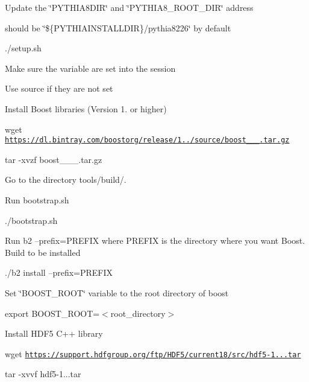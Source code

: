 \begin{DoxyEnumerate}
\begin{DoxyItemize}
\item Update the \char`\"{}\+P\+Y\+T\+H\+I\+A8\+D\+I\+R\char`\"{} and \char`\"{}\+P\+Y\+T\+H\+I\+A8\+\_\+\+R\+O\+O\+T\+\_\+\+D\+I\+R\char`\"{} address
\begin{DoxyItemize}
\item should be \char`\"{}\$\{\+P\+Y\+T\+H\+I\+A\+I\+N\+S\+T\+A\+L\+L\+D\+I\+R\}/pythia8226\char`\"{} by default
\end{DoxyItemize}
\item ./setup.sh
\item Make sure the variable are set into the session
\item Use source if they are not set
\end{DoxyItemize}
\item Install Boost libraries (Version 1. or higher)
\begin{DoxyItemize}
\item wget \href{https://dl.bintray.com/boostorg/release/1.64.0/source/boost_1_64_0.tar.gz}{\tt https\+://dl.\+bintray.\+com/boostorg/release/1../source/boost\+\_\+\_\+\_.\+tar.\+gz}
\item tar -\/xvzf boost\+\_\+\_\+\_.\+tar.\+gz
\item Go to the directory tools/build/.
\item Run bootstrap.\+sh
\begin{DoxyItemize}
\item ./bootstrap.sh
\end{DoxyItemize}
\item Run b2 --prefix=P\+R\+E\+F\+IX where P\+R\+E\+F\+IX is the directory where you want Boost. Build to be installed
\begin{DoxyItemize}
\item ./b2 install --prefix=P\+R\+E\+F\+IX
\end{DoxyItemize}
\item Set \char`\"{}\+B\+O\+O\+S\+T\+\_\+\+R\+O\+O\+T\char`\"{} variable to the root directory of boost
\item export B\+O\+O\+S\+T\+\_\+\+R\+O\+OT=$<$root\+\_\+directory$>$
\end{DoxyItemize}
\item Install H\+D\+F5 C++ library
\begin{DoxyItemize}
\item wget \href{https://support.hdfgroup.org/ftp/HDF5/current18/src/hdf5-1.8.18.tar}{\tt https\+://support.\+hdfgroup.\+org/ftp/\+H\+D\+F5/current18/src/hdf5-\/1...\+tar}
\item tar -\/xvvf hdf5-\/1...\+tar

\end{DoxyItemize}
\end{DoxyEnumerate}
